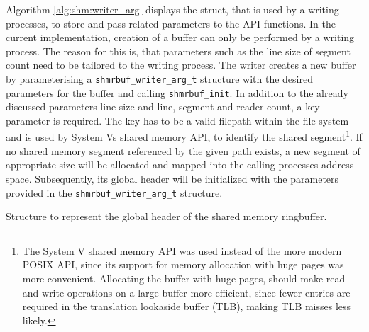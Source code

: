 Algorithm \ref{alg:shm:writer_arg} displays the struct, that is used by a writing processes, to store and pass related parameters to the API functions.
In the current implementation, creation of a buffer can only be performed by a writing process. The reason for this is, that parameters such as the line
size of segment count need to be tailored to the writing process. The writer creates a new buffer by parameterising a \texttt{shmrbuf\_writer\_arg\_t} structure with
the desired parameters for the buffer and calling \texttt{shmrbuf\_init}. In addition to the already discussed parameters line size and line, segment and reader count, 
a key parameter is required. The key has to be a valid filepath within the file system and is used by System Vs shared memory API, to identify the shared segment\footnote{The System V shared memory API \cite{systemvshm} was used instead of the more modern POSIX API, since its support for memory allocation with huge pages was more convenient. Allocating the buffer with huge pages, should make read and write operations on a large buffer more efficient, since fewer entries are required in the translation lookaside buffer (TLB), making TLB misses less likely.}.  
If no shared memory segment referenced by the given path exists, a new segment of appropriate size will be allocated and mapped into the calling processes address space. Subsequently, its global header will 
be initialized with the parameters provided in the \texttt{shmrbuf\_writer\_arg\_t} structure.  

\begin{algorithm}[h!]
    
    \label{alg:shm:global_hdr}
    \caption[Shared Memory Ringbuffer: Global Header]{Structure to represent the global header of the shared memory ringbuffer.}
\end{algorithm}

